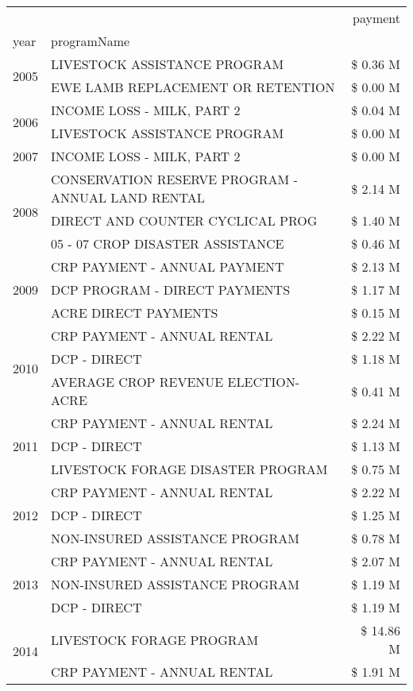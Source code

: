 \begin{tabular}{llr}
\toprule
 &  & payment \\
year & programName &  \\
\midrule
\multirow[t]{2}{*}{2005} & LIVESTOCK ASSISTANCE PROGRAM & \$ 0.36 M \\
 & EWE LAMB REPLACEMENT OR RETENTION & \$ 0.00 M \\
\cline{1-3}
\multirow[t]{2}{*}{2006} & INCOME LOSS - MILK, PART 2 & \$ 0.04 M \\
 & LIVESTOCK ASSISTANCE PROGRAM & \$ 0.00 M \\
\cline{1-3}
2007 & INCOME LOSS - MILK, PART 2 & \$ 0.00 M \\
\cline{1-3}
\multirow[t]{3}{*}{2008} & CONSERVATION RESERVE PROGRAM - ANNUAL LAND RENTAL & \$ 2.14 M \\
 & DIRECT AND COUNTER CYCLICAL PROG & \$ 1.40 M \\
 & 05 - 07 CROP DISASTER ASSISTANCE & \$ 0.46 M \\
\cline{1-3}
\multirow[t]{3}{*}{2009} & CRP PAYMENT - ANNUAL PAYMENT & \$ 2.13 M \\
 & DCP PROGRAM - DIRECT PAYMENTS & \$ 1.17 M \\
 & ACRE DIRECT PAYMENTS & \$ 0.15 M \\
\cline{1-3}
\multirow[t]{3}{*}{2010} & CRP PAYMENT - ANNUAL RENTAL & \$ 2.22 M \\
 & DCP - DIRECT & \$ 1.18 M \\
 & AVERAGE CROP REVENUE ELECTION-ACRE & \$ 0.41 M \\
\cline{1-3}
\multirow[t]{3}{*}{2011} & CRP PAYMENT - ANNUAL RENTAL & \$ 2.24 M \\
 & DCP - DIRECT & \$ 1.13 M \\
 & LIVESTOCK FORAGE DISASTER PROGRAM & \$ 0.75 M \\
\cline{1-3}
\multirow[t]{3}{*}{2012} & CRP PAYMENT - ANNUAL RENTAL & \$ 2.22 M \\
 & DCP - DIRECT & \$ 1.25 M \\
 & NON-INSURED ASSISTANCE PROGRAM & \$ 0.78 M \\
\cline{1-3}
\multirow[t]{3}{*}{2013} & CRP PAYMENT - ANNUAL RENTAL & \$ 2.07 M \\
 & NON-INSURED ASSISTANCE PROGRAM & \$ 1.19 M \\
 & DCP - DIRECT & \$ 1.19 M \\
\cline{1-3}
\multirow[t]{3}{*}{2014} & LIVESTOCK FORAGE PROGRAM & \$ 14.86 M \\
 & CRP PAYMENT - ANNUAL RENTAL & \$ 1.91 M \\

\end{tabular}
